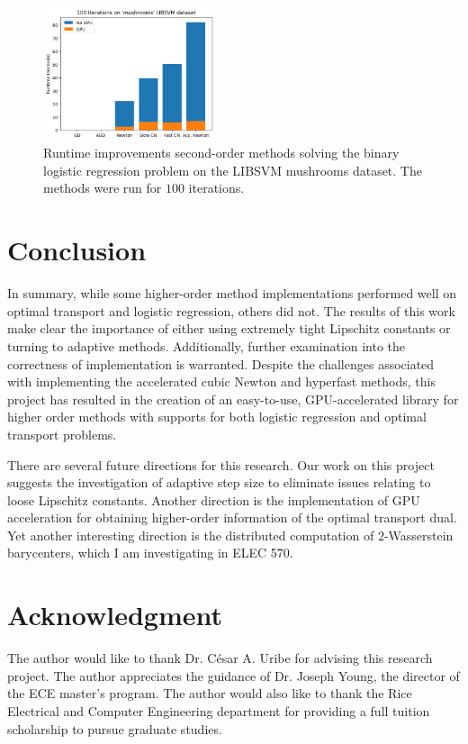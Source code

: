 \documentclass[journal]{IEEEtran}
\begin{document}
\begin{figure}
    \centering
    \includegraphics[width=0.45\textwidth]{img/gpu_results.png}
    \caption{Runtime improvements second-order methods solving the binary logistic regression problem on the LIBSVM mushrooms dataset. The methods were run for $100$ iterations.}
    \label{fig:gpu_results}
\end{figure}

\section{Conclusion}
\label{sec:conclusion}
In summary, while some higher-order method implementations performed well on optimal transport and logistic regression, others did not. The results of this work make clear the importance of either using extremely tight Lipschitz constants or turning to adaptive methods. Additionally, further examination into the correctness of implementation is warranted. Despite the challenges associated with implementing the accelerated cubic Newton and hyperfast methods, this project has resulted in the creation of an easy-to-use, GPU-accelerated library for higher order methods with supports for both logistic regression and optimal transport problems.

There are several future directions for this research. Our work on this project suggests the investigation of adaptive step size to eliminate issues relating to loose Lipschitz constants. Another direction is the implementation of GPU acceleration for obtaining higher-order information of the optimal transport dual. Yet another interesting direction is the distributed computation of $2$-Wasserstein barycenters, which I am investigating in ELEC 570.

\section*{Acknowledgment} \label{sec:acknowledgement}

The author would like to thank Dr. C\'esar A. Uribe for advising this research project. The author appreciates the guidance of Dr. Joseph Young, the director of the ECE master's program. The author would also like to thank the Rice Electrical and Computer Engineering department for providing a full tuition scholarship to pursue graduate studies.
\end{document}
